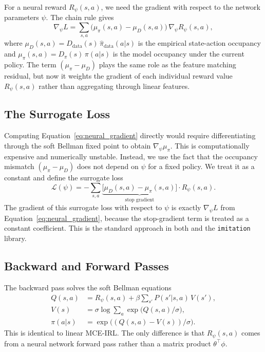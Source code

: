 \documentclass[10pt]{article}
\begin{document}
For a neural reward $R_\psi(s,a)$, we need the gradient with respect to the network parameters $\psi$. The chain rule gives
\begin{equation}
\label{eq:neural_gradient}
\nabla_\psi L = \sum_{s,a} \bigl(\mu_\pi(s,a) - \mu_D(s,a)\bigr)\, \nabla_\psi R_\psi(s,a),
\end{equation}
where $\mu_D(s,a) = D_{\text{data}}(s)\,\hat\pi_{\text{data}}(a|s)$ is the empirical state-action occupancy and $\mu_\pi(s,a) = D_\pi(s)\,\pi(a|s)$ is the model occupancy under the current policy. The term $(\mu_\pi - \mu_D)$ plays the same role as the feature matching residual, but now it weights the gradient of each individual reward value $R_\psi(s,a)$ rather than aggregating through linear features.


\subsection{The Surrogate Loss}

Computing Equation~\eqref{eq:neural_gradient} directly would require differentiating through the soft Bellman fixed point to obtain $\nabla_\psi \mu_\pi$. This is computationally expensive and numerically unstable. Instead, we use the fact that the occupancy mismatch $(\mu_\pi - \mu_D)$ does not depend on $\psi$ for a fixed policy. We treat it as a constant and define the surrogate loss
\begin{equation}
\label{eq:surrogate}
\mathcal{L}(\psi) = -\sum_{s,a} \underbrace{\bigl[\mu_D(s,a) - \mu_\pi(s,a)\bigr]}_{\text{stop gradient}} \cdot R_\psi(s,a).
\end{equation}
The gradient of this surrogate loss with respect to $\psi$ is exactly $\nabla_\psi L$ from Equation~\eqref{eq:neural_gradient}, because the stop-gradient term is treated as a constant coefficient. This is the standard approach in both \citet{wulfmeier2016} and the \texttt{imitation} library.


\subsection{Backward and Forward Passes}

The backward pass solves the soft Bellman equations
\begin{align}
Q(s,a) &= R_\psi(s,a) + \beta \sum_{s'} P(s'|s,a)\, V(s'), \\
V(s) &= \sigma \log \sum_a \exp\bigl(Q(s,a)/\sigma\bigr), \\
\pi(a|s) &= \exp\bigl((Q(s,a) - V(s))/\sigma\bigr).
\end{align}
This is identical to linear MCE-IRL. The only difference is that $R_\psi(s,a)$ comes from a neural network forward pass rather than a matrix product $\theta^\top\phi$.
\end{document}
